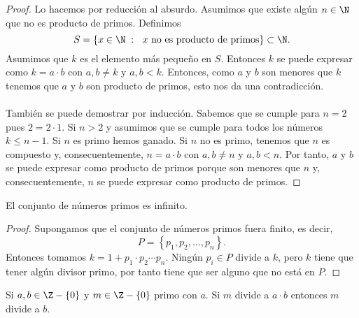  \begin{proof}
 Lo hacemos por reducción al absurdo. Asumimos que existe algún $\displaystyle n\in \N $ que no es producto de primos. Definimos
\[\displaystyle S = \left\{ x \in \N\; : \; \text{ $\displaystyle x $ no es producto de primos} \right\} \subset \N. \]
Asumimos que $\displaystyle k $ es el elemento más pequeño en $\displaystyle S $. Entonces $\displaystyle k $ se puede expresar como $\displaystyle k = a \cdot b $ con $\displaystyle a,b \neq k $ y $\displaystyle a, b < k $. Entonces, como $\displaystyle a $ y $\displaystyle b $ son menores que $\displaystyle k $ tenemos que $\displaystyle a $ y $\displaystyle b $ son producto de primos, esto nos da una contradicción. \\ \\
También se puede demostrar por inducción. Sabemos que se cumple para $\displaystyle n = 2 $  pues $\displaystyle 2 = 2 \cdot 1 $. Si $\displaystyle n >2 $ y asumimos que se cumple para todos los números $\displaystyle k \leq n - 1 $. Si $\displaystyle n $ es primo hemos ganado. Si $\displaystyle n $ no es primo, tenemos que $\displaystyle n $ es compuesto y, consecuentemente, $\displaystyle n = a \cdot b $ con $\displaystyle a,b \neq n $ y $\displaystyle a,b <n $. Por tanto, $\displaystyle a$ y $\displaystyle b $ se puede expresar como producto de primos porque son menores que $\displaystyle n $ y, consecuentemente, $\displaystyle n $ se puede expresar como producto de primos.
 \end{proof}
 
\begin{ftheorem}
\normalfont El conjunto de números primos es infinito.
\end{ftheorem}

\begin{proof}
Supongamos que el conjunto de números primos fuera finito, es decir,
\[P = \left\{ p_{1}, p_{2}, \ldots, p_{n}\right\}  .\]
Entonces tomamos $\displaystyle k = 1 + p_{1} \cdot p_{2} \cdots p_{n} $. Ningún $\displaystyle p_{i} \in P $ divide a $\displaystyle k $, pero $\displaystyle k $ tiene que tener algún divisor primo, por tanto tiene que ser alguno que no está en $\displaystyle P $.
\end{proof}

\begin{ftheorem}[]
	\normalfont Si $\displaystyle a,b \in \Z - \left\{ 0\right\}  $  y $\displaystyle m \in \Z - \left\{ 0\right\}  $ primo con $\displaystyle a $. Si $\displaystyle m $ divide a $\displaystyle a \cdot b $ entonces $\displaystyle m $ divide a $\displaystyle b $.
\end{ftheorem}

